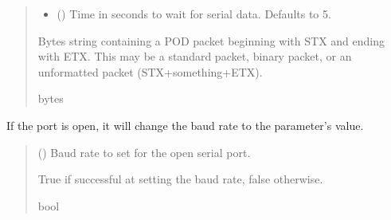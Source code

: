 \documentclass[letterpaper,10pt,english]{sphinxmanual}
\begin{document}
\begin{fulllineitems}
\begin{fulllineitems}
\begin{quote}
\begin{description}
\begin{itemize}
\item {} 
\sphinxAtStartPar
{} (\sphinxstyleliteralemphasis{\sphinxupquote{|}}\sphinxstyleliteralemphasis{\sphinxupquote{, }}) \textendash{} Time in seconds to wait for serial data.                 Defaults to 5.

\end{itemize}

\sphinxAtStartPar
Bytes string containing a POD packet beginning with STX and ending with ETX. This                 may be a standard packet, binary packet, or an unformatted packet (STX+something+ETX).

\sphinxAtStartPar
bytes

\end{description}\end{quote}

\end{fulllineitems}


\begin{fulllineitems}
\label{\detokenize{BasicPodProtocol:BasicPodProtocol.POD_Basics.SetBaudrateOfDevice}}
\pysigstartsignatures
{}
\pysigstopsignatures
\sphinxAtStartPar
If the port is open, it will change the baud rate to the parameter’s value.
\begin{quote}\begin{description}
\sphinxAtStartPar
{} () \textendash{} Baud rate to set for the open serial port.

\sphinxAtStartPar
True if successful at setting the baud rate, false otherwise.

\sphinxAtStartPar
bool

\end{description}\end{quote}


\end{fulllineitems}
\end{fulllineitems}
\end{document}
